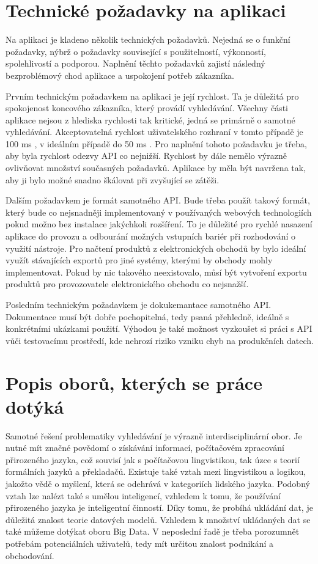 \documentclass[FM,DP]{tulthesis}
\begin{document}
\section{Technické požadavky na aplikaci}

Na aplikaci je kladeno několik technických požadavků. Nejedná se o funkční požadavky, nýbrž
o požadavky související s použitelností, výkonností, spolehlivostí a podporou. Naplnění těchto
požadavků zajistí následný bezproblémový chod aplikace a uspokojení potřeb zákazníka.

Prvním technickým požadavkem na aplikaci je její rychlost. Ta je důležitá pro spokojenost
koncového zákazníka, který provádí vyhledávání. Všechny části aplikace nejsou z hlediska rychlosti
tak kritické, jedná se primárně o samotné vyhledávání. Akceptovatelná rychlost uživatelského rozhraní 
v tomto případě je 100 ms \cite{amazon-100ms}, v ideálním případě do 50 ms \cite{stackshare-algolia}. 
Pro naplnění tohoto požadavku je třeba, aby byla rychlost odezvy API co nejnižší.
Rychlost by dále nemělo výrazně ovlivňovat množství současných požadavků. 
Aplikace by měla být navržena tak, aby ji bylo možné snadno škálovat při zvyšující se zátěži.

Dalším požadavkem je formát samotného API. Bude třeba použít takový formát, který bude
co nejsnadněji implementovaný v používaných webových technologiích pokud možno bez instalace
jakýchkoli rozšíření. To je důležité pro rychlé nasazení aplikace do provozu a odbourání
možných vstupních bariér při rozhodování o využití nástroje. Pro načtení produktů
z elektronických obchodů by bylo ideální využít stávajících exportů pro jiné systémy, 
kterými by obchody mohly implementovat. Pokud by nic takového neexistovalo, můsí být vytvoření
exportu produktů pro provozovatele elektronického obchodu co nejsnažší.

Posledním technickým požadavkem je dokukemantace samotného API. Dokumentace musí být
dobře pochopitelná, tedy psaná přehledně, ideálně s konkrétními ukázkami použití.
Výhodou je také možnost vyzkoušet si práci s API vůči testovacímu prostředí, 
kde nehrozí riziko vzniku chyb na produkčních datech.

\section{Popis oborů, kterých se práce dotýká}

Samotné řešení problematiky vyhledávání je výrazně interdisciplinární obor. Je nutné
mít značné povědomí o získávání informací, počítačovém zpracování přirozeného jazyka, 
což souvisí jak s počítačovou lingvistikou, tak úzce s teorií formálních jazyků a překladačů.
Existuje také vztah mezi lingvistikou a logikou, jakožto vědě o myšlení, která se odehrává 
v kategoriích lidského jazyka. Podobný vztah lze nalézt také s umělou inteligencí, 
vzhledem k tomu, že používání přirozeného jazyka je inteligentní činností.
Díky tomu, že probíhá ukládání dat, je důležitá znalost teorie datových modelů.
Vzhledem k množství ukládaných dat se také můžeme dotýkat oboru Big Data.
V neposlední řadě je třeba porozumnět potřebám potenciálních uživatelů, tedy mít
určitou znalost podnikání a obchodování.
\end{document}
